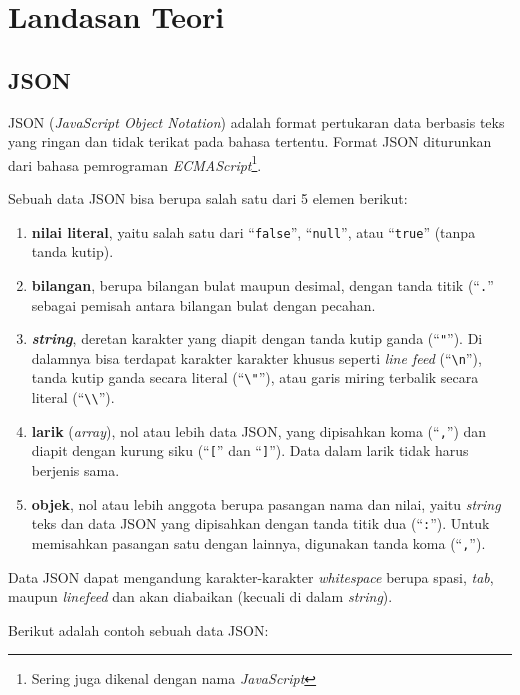 \chapter{Landasan Teori}

\section{JSON}

JSON (\textit{JavaScript Object Notation}) adalah format pertukaran data berbasis teks yang ringan dan tidak terikat pada bahasa tertentu\cite{rfc7159}. Format JSON diturunkan dari bahasa pemrograman \textit{ECMAScript}\footnote{Sering juga dikenal dengan nama \textit{JavaScript}}.

Sebuah data JSON bisa berupa salah satu dari 5 elemen berikut:

\begin{enumerate}
	\item \textbf{nilai literal}, yaitu salah satu dari ``\texttt{false}'', ``\texttt{null}'', atau ``\texttt{true}'' (tanpa tanda kutip).
	\item \textbf{bilangan}, berupa bilangan bulat maupun desimal, dengan tanda titik (``\texttt{.}'' sebagai pemisah antara bilangan bulat dengan pecahan.
	\item \textbf{\textit{string}}, deretan karakter yang diapit dengan tanda kutip ganda (``\verb/"/''). Di dalamnya bisa terdapat karakter karakter khusus seperti \textit{line feed} (``\verb/\n/''), tanda kutip ganda secara literal (``\verb/\"/''), atau garis miring terbalik secara literal (``\verb/\\/'').
	\item \textbf{larik} (\textit{array}), nol atau lebih data JSON, yang dipisahkan koma (``\verb/,/'') dan diapit dengan kurung siku (``\verb/[/'' dan ``\verb/]/''). Data dalam larik tidak harus berjenis sama.
	\item \textbf{objek}, nol atau lebih anggota berupa pasangan nama dan nilai, yaitu \textit{string} teks dan data JSON yang dipisahkan dengan tanda titik dua (``\verb/:/''). Untuk memisahkan pasangan satu dengan lainnya, digunakan tanda koma (``\verb/,/'').
\end{enumerate}

Data JSON dapat mengandung karakter-karakter \textit{whitespace} berupa spasi, \textit{tab}, maupun \textit{linefeed} dan akan diabaikan (kecuali di dalam \textit{string}).

Berikut adalah contoh sebuah data JSON:

